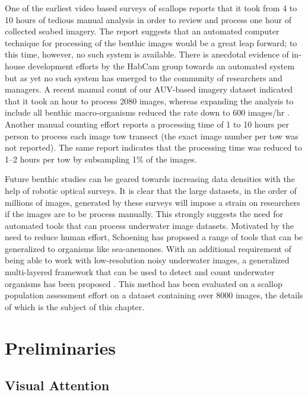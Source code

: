 \documentclass {udthesis}
\begin{document}
One of the earliest video based surveys of scallops \cite{rosenkratz} reports that
it took from 4 to 10 hours of tedious manual analysis in order to review and process one hour
of collected seabed imagery. The report suggests that an automated computer technique for
processing of the benthic images would be a great leap forward; to this time, however, no
such system is available. There is anecdotal evidence of in-house development efforts by the
HabCam group \cite{gallager} towards an automated system but as yet no such
system has emerged to the community of researchers and managers. A recent manual count
of our AUV-based imagery dataset indicated that it took an hour to process 2080 images,
whereas expanding the analysis to include all benthic macro-organisms reduced the rate
down to 600 images/hr \cite{walker}. Another manual counting effort \cite{oremland} 
reports a processing time of 1 to 10 hours per person to process each image tow
transect (the exact image number per tow was not reported). The same report indicates that
the processing time was reduced to 1–2 hours per tow by subsampling 1\% of the images.

Future benthic studies can be geared towards increasing data densities with the help of robotic optical surveys.
It is clear that the large datasets, in the order of millions of images, generated by these surveys will impose 
a strain on researchers if the images are to be process manually. This strongly suggests the need for automated tools
that can process underwater image datasets. Motivated by the need to reduce human effort, Schoening \cite{schoening} has proposed a range of tools that
can be generalized to organisms like sea-anemones. With an additional requirement of being able to work with low-resolution noisy underwater images, 
a generalized multi-layered framework that can be used to detect and count underwater organisms has been proposed \cite{prasanna_med, prasanna_aslo, prasanna_igi}. This method has been evaluated on a scallop population assessment effort on a dataset containing over 8000 images, the details of which is the subject of this chapter.

\section{Preliminaries}

\subsection{Visual Attention}
\label{sec:visual_attn}
\end{document}
